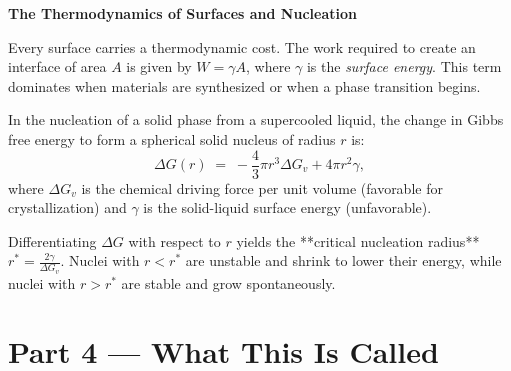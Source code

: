\documentclass[12pt, a4paper]{book}
\newcommand{\newterm}[1]{\textit{\textcolor{DiscoveryColor}{#1}}}
\begin{document}
\begin{discoverybox}
\textbf{The Thermodynamics of Surfaces and Nucleation}

Every surface carries a thermodynamic cost. The work required to create an interface of area $A$ is given by $W = \gamma A$, where $\gamma$ is the \newterm{surface energy}. This term dominates when materials are synthesized or when a phase transition begins.

In the nucleation of a solid phase from a supercooled liquid, the change in Gibbs free energy to form a spherical solid nucleus of radius $r$ is:
\[
  \Delta G(r) \;=\; -\frac{4}{3}\pi r^3 \Delta G_v + 4\pi r^2 \gamma,
\]
where $\Delta G_v$ is the chemical driving force per unit volume (favorable for crystallization) and $\gamma$ is the solid-liquid surface energy (unfavorable).

\begin{center}
\end{center}

Differentiating $\Delta G$ with respect to $r$ yields the **critical nucleation radius** $r^* = \frac{2\gamma}{\Delta G_v}$. Nuclei with $r < r^*$ are unstable and shrink to lower their energy, while nuclei with $r > r^*$ are stable and grow spontaneously.
\end{discoverybox}

\newpage

\section{Part 4 --- What This Is Called}
\end{document}
